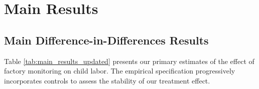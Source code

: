 
\section{Main Results}

\subsection{Main Difference-in-Differences Results}

Table \ref{tab:main_results_updated} presents our primary estimates of the effect of factory monitoring on child labor. The empirical specification progressively incorporates controls to assess the stability of our treatment effect.

